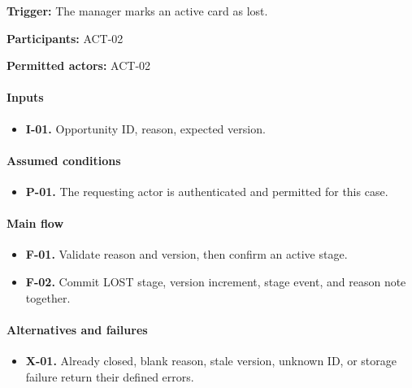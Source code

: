 \documentclass[10pt,a4paper]{article}
\begin{document}
\textbf{Trigger:} The manager marks an active card as lost.

\textbf{Participants:} ACT-02

\textbf{Permitted actors:} ACT-02

\paragraph{Inputs}

\begin{itemize}

\item \textbf{I-01.} Opportunity ID, reason, expected version.

\end{itemize}

\paragraph{Assumed conditions}

\begin{itemize}

\item \textbf{P-01.} The requesting actor is authenticated and permitted for this case.

\end{itemize}

\paragraph{Main flow}

\begin{itemize}

\item \textbf{F-01.} Validate reason and version, then confirm an active stage.

\item \textbf{F-02.} Commit LOST stage, version increment, stage event, and reason note together.

\end{itemize}

\paragraph{Alternatives and failures}

\begin{itemize}

\item \textbf{X-01.} Already closed, blank reason, stale version, unknown ID, or storage failure return their defined errors.

\end{itemize}
\end{document}
